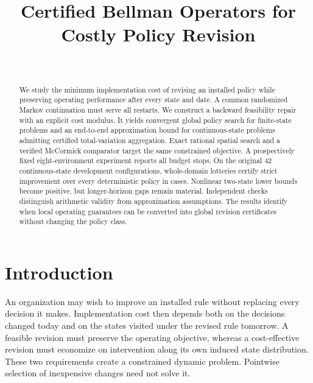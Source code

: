 


\begin{frontmatter}
\title{Certified Bellman Operators for Costly Policy Revision}
\begin{aug}\author[id=au1,addressref={add1}]{~}\address[id=add1]{}\end{aug}
\begin{abstract}
We study the minimum implementation cost of revising an installed policy while preserving operating performance after every state and date. A common randomized Markov continuation must serve all restarts. We construct a backward feasibility repair with an explicit cost modulus. It yields convergent global policy search for finite-state problems and an end-to-end approximation bound for continuous-state problems admitting certified total-variation aggregation. Exact rational spatial search and a verified McCormick comparator target the same constrained objective. A prospectively fixed eight-environment experiment reports all budget stops. On the original 42 continuous-state development configurations, whole-domain lotteries certify strict improvement over every deterministic policy in \PrimaryStrict{} cases. Nonlinear two-state lower bounds become positive, but longer-horizon gaps remain material. Independent checks distinguish arithmetic validity from approximation assumptions. The results identify when local operating guarantees can be converted into global revision certificates without changing the policy class.
\end{abstract}
\begin{keyword}\end{keyword}
\end{frontmatter}

\section{Introduction}\label{sec:introduction}
An organization may wish to improve an installed rule without replacing every decision it makes. Implementation cost then depends both on the decisions changed today and on the states visited under the revised rule tomorrow. A feasible revision must preserve the operating objective, whereas a cost-effective revision must economize on intervention along its own induced state distribution. These two requirements create a constrained dynamic problem. Pointwise selection of inexpensive changes need not solve it.

